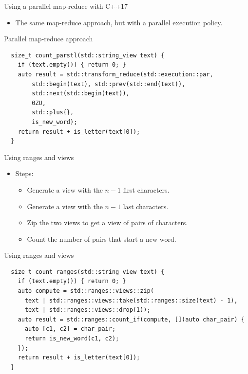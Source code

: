 \begin{frame}[t,fragile]{Using a parallel map-reduce with C++17}
    \begin{itemize}
        \item The same map-reduce approach, but with a parallel execution policy.
    \end{itemize}

\begin{block}{Parallel map-reduce approach}
\begin{lstlisting}
  size_t count_parstl(std::string_view text) {
    if (text.empty()) { return 0; }
    auto result = std::transform_reduce(std::execution::par, 
        std::begin(text), std::prev(std::end(text)),
        std::next(std::begin(text)), 
        0ZU, 
        std::plus{},
        is_new_word);
    return result + is_letter(text[0]);
  }
\end{lstlisting}
\end{block}
\end{frame}

\begin{frame}[t,fragile]{Using ranges and views}
\begin{itemize}
  \item Steps:
    \begin{itemize}
      \item Generate a view with the $n-1$ first characters.
      \item Generate a view with the $n-1$ last characters.
      \item Zip the two views to get a view of pairs of characters.
      \item Count the number of pairs that start a new word.
    \end{itemize}
\end{itemize}

\begin{block}{Using ranges and views}
\begin{lstlisting}
  size_t count_ranges(std::string_view text) {
    if (text.empty()) { return 0; }
    auto compute = std::ranges::views::zip(
      text | std::ranges::views::take(std::ranges::size(text) - 1),
      text | std::ranges::views::drop(1));
    auto result = std::ranges::count_if(compute, [](auto char_pair) {
      auto [c1, c2] = char_pair;
      return is_new_word(c1, c2);
    });
    return result + is_letter(text[0]);
  }
\end{lstlisting}
\end{block}
\end{frame}

